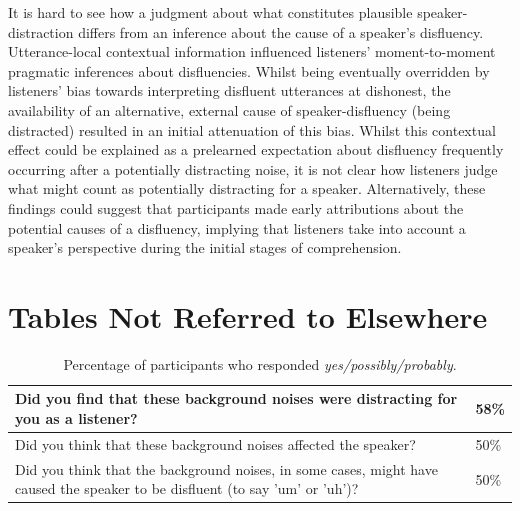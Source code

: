 \documentclass[a4paper,man,natbib]{apa6}
\begin{document}
It is hard to see how a judgment about what constitutes plausible speaker-distraction differs from an inference about the cause of a speaker's disfluency.\\

Utterance-local contextual information influenced listeners' moment-to-moment pragmatic inferences about disfluencies. 
Whilst being eventually overridden by listeners' bias towards interpreting disfluent utterances at dishonest, the availability of an alternative, external cause of speaker-disfluency (being distracted) resulted in an initial attenuation of this bias. 
Whilst this contextual effect could be explained as a prelearned expectation about disfluency frequently occurring after a potentially distracting noise, it is not clear how listeners judge what might count as potentially distracting for a speaker.
Alternatively, these findings could suggest that participants made early attributions about the potential causes of a disfluency, implying that listeners take into account a speaker's perspective during the initial stages of comprehension. 



%


\appendix
\section{Tables Not Referred to Elsewhere}



\begin{table}[ht]
\centering
\begin{tabularx}{\linewidth}{|X|X|}
	\hline
Did you find that these background noises were distracting for you as a listener? & 58\%\\ 
   \hline
Did you think that these background noises affected the speaker? & 50\%\\
   \hline
Did you think that the background noises, in some cases, might have caused the speaker to be disfluent (to say 'um' or 'uh')? & 50\%\\
   \hline
\end{tabularx}
\caption{Percentage of participants who responded \textit{yes/possibly/probably}.}
\label{table:questions}
\end{table}
\end{document}

